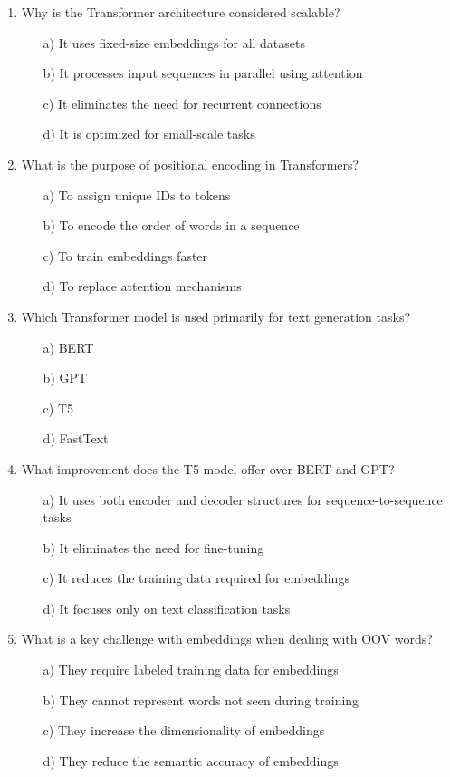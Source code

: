 \documentclass[8pt]{extarticle}
\begin{document}
\begin{multicols}{2}
\begin{enumerate}
\item Why is the Transformer architecture considered scalable?
\begin{itemize}
\item[a)] It uses fixed-size embeddings for all datasets
\item[b)] It processes input sequences in parallel using attention
\item[c)] It eliminates the need for recurrent connections
\item[d)] It is optimized for small-scale tasks
\end{itemize}

\item What is the purpose of positional encoding in Transformers?
\begin{itemize}
\item[a)] To assign unique IDs to tokens
\item[b)] To encode the order of words in a sequence
\item[c)] To train embeddings faster
\item[d)] To replace attention mechanisms
\end{itemize}

\item Which Transformer model is used primarily for text generation tasks?
\begin{itemize}
\item[a)] BERT
\item[b)] GPT
\item[c)] T5
\item[d)] FastText
\end{itemize}

\item What improvement does the T5 model offer over BERT and GPT?
\begin{itemize}
\item[a)] It uses both encoder and decoder structures for sequence-to-sequence tasks
\item[b)] It eliminates the need for fine-tuning
\item[c)] It reduces the training data required for embeddings
\item[d)] It focuses only on text classification tasks
\end{itemize}


\item What is a key challenge with embeddings when dealing with OOV words?
\begin{itemize}
\item[a)] They require labeled training data for embeddings
\item[b)] They cannot represent words not seen during training
\item[c)] They increase the dimensionality of embeddings
\item[d)] They reduce the semantic accuracy of embeddings
\end{itemize}


\end{enumerate}
\end{multicols}
\end{document}
